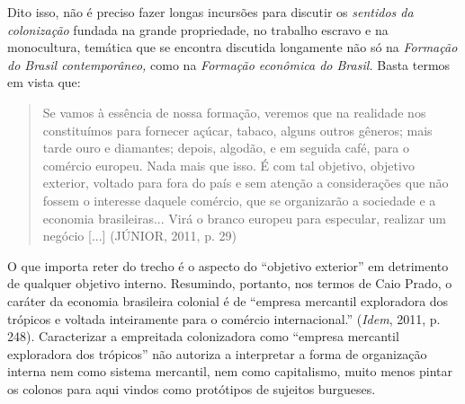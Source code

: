 Dito isso, não é preciso fazer longas incursões para discutir os
\emph{sentidos da colonização} fundada na grande propriedade, no
trabalho escravo e na monocultura, temática que se encontra discutida
longamente não só na \emph{Formação do Brasil contemporâneo,} como na
\emph{Formação econômica do Brasil.} Basta termos em vista que:

\begin{quote}
Se vamos à essência de nossa formação, veremos que na realidade nos
constituímos para fornecer açúcar, tabaco, alguns outros gêneros; mais
tarde ouro e diamantes; depois, algodão, e em seguida café, para o
comércio europeu. Nada mais que isso. É com tal objetivo, objetivo
exterior, voltado para fora do país e sem atenção a considerações que
não fossem o interesse daquele comércio, que se organizarão a sociedade
e a economia brasileiras... Virá o branco europeu para especular,
realizar um negócio {[}...{]} (JÚNIOR, 2011, p. 29)
\end{quote}

O que importa reter do trecho é o aspecto do ``objetivo exterior'' em
detrimento de qualquer objetivo interno. Resumindo, portanto, nos termos
de Caio Prado, o caráter da economia brasileira colonial é de ``empresa
mercantil exploradora dos trópicos e voltada inteiramente para o
comércio internacional.'' (\emph{Idem}, 2011, p. 248). Caracterizar a
empreitada colonizadora como ``empresa mercantil exploradora dos
trópicos'' não autoriza a interpretar a forma de organização interna nem
como sistema mercantil, nem como capitalismo, muito menos pintar os
colonos para aqui vindos como protótipos de sujeitos burgueses.

